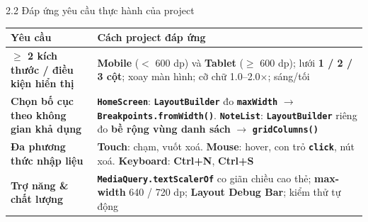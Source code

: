 \documentclass[aspectratio=169,10pt]{beamer}
\newcommand{\api}[1]{\texttt{\bfseries #1}}   %
\begin{document}
\begin{frame}{2.2 Đáp ứng yêu cầu thực hành của project}
  \footnotesize
  \renewcommand{\arraystretch}{1.4}
  \centering
  \begin{tabular}{@{}>{\raggedright\arraybackslash}p{3.4cm}>{\raggedright\arraybackslash}p{9.0cm}@{}}
    \hline
    \rowcolor{cHead}\textbf{Yêu cầu} & \textbf{Cách project đáp ứng}\\ \hline
    \textbf{$\geq$ 2 kích thước / điều kiện hiển thị} & \textbf{Mobile} ($<$ 600 dp) và \textbf{Tablet} ($\geq$ 600 dp); lưới \textbf{1 / 2 / 3 cột}; xoay màn hình; cỡ chữ 1.0--2.0$\times$; sáng/tối\\ \hline
    \textbf{Chọn bố cục theo không gian khả dụng} & \api{HomeScreen}: \api{LayoutBuilder} đo \api{maxWidth} $\rightarrow$ \api{Breakpoints.fromWidth()}. \api{NoteList}: \api{LayoutBuilder} riêng đo \textbf{bề rộng vùng danh sách} $\rightarrow$ \api{gridColumns()}\\ \hline
    \textbf{Đa phương thức nhập liệu} & \textbf{Touch}: chạm, vuốt xoá. \textbf{Mouse}: hover, con trỏ \api{click}, nút xoá. \textbf{Keyboard}: \textbf{Ctrl+N}, \textbf{Ctrl+S}\\ \hline
    \textbf{Trợ năng \& chất lượng} & \api{MediaQuery.textScalerOf} co giãn chiều cao thẻ; \textbf{max-width} 640 / 720 dp; \textbf{Layout Debug Bar}; kiểm thử tự động\\ \hline
  \end{tabular}
\end{frame}
\end{document}
